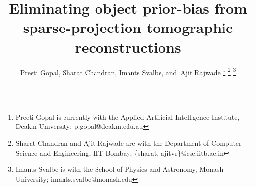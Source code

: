 \documentclass[journal]{IEEEtran}
\begin{document}
%
\title{Eliminating object prior-bias from sparse-projection tomographic reconstructions}
%
%
%

\author{Preeti Gopal,
  Sharat Chandran,
  Imants Svalbe,
        and~Ajit Rajwade
\thanks{Preeti Gopal is currently with the Applied Artificial Intelligence Institute, Deakin University; p.gopal@deakin.edu.au}
\thanks{Sharat Chandran and Ajit Rajwade are with the Department of Computer Science and Engineering, IIT Bombay; \{sharat, ajitvr\}@cse.iitb.ac.in}
\thanks{Imants Svalbe is with the School of Physics and Astronomy, Monash University; imants.svalbe@monash.edu}}



\maketitle
\end{document}
